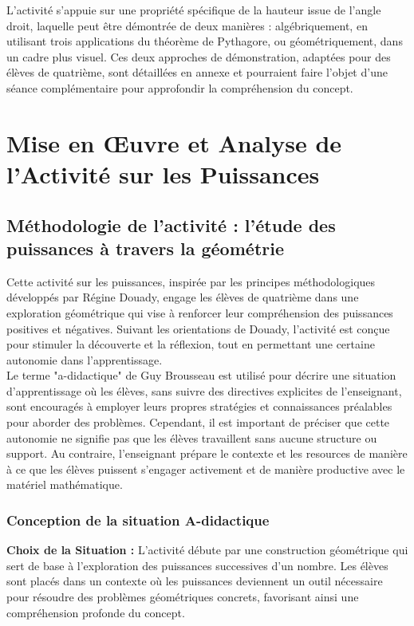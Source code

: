 L'activité s'appuie sur une propriété  spécifique de la hauteur issue de l'angle
droit, laquelle peut être démontrée de deux manières : algébriquement, en
utilisant trois applications du théorème de Pythagore, ou géométriquement, dans
un cadre plus visuel. Ces deux approches de démonstration, adaptées pour des
élèves de quatrième, sont détaillées en annexe et pourraient faire l'objet d'une
séance complémentaire pour approfondir la compréhension du concept.

\section{Mise en Œuvre et Analyse de l'Activité sur les Puissances}

\subsection{Méthodologie de l'activité : l'étude des puissances à travers la géométrie}

Cette activité sur les puissances,
inspirée par les principes méthodologiques développés par Régine Douady,
engage les élèves de quatrième dans une exploration géométrique qui vise à renforcer leur compréhension des puissances positives et négatives.
Suivant les orientations de Douady,
l'activité est conçue pour stimuler la découverte et la réflexion,
tout en permettant une certaine autonomie dans l'apprentissage.\\

Le terme "a-didactique" de Guy Brousseau \cite{brousseau} est utilisé pour décrire une situation d'apprentissage où les élèves,
sans suivre des directives explicites de l'enseignant,
sont encouragés à employer leurs propres stratégies et connaissances préalables pour aborder des problèmes.
Cependant,
il est important de préciser que cette autonomie ne signifie pas que les élèves travaillent sans aucune structure ou support.
Au contraire,
l'enseignant prépare le contexte et les resources de manière à ce que les élèves puissent s'engager activement et de manière productive avec le matériel mathématique.

\subsubsection{Conception de la situation A-didactique}

\textbf{Choix de la Situation :}
L'activité débute par une construction géométrique qui sert de base à l'exploration des puissances successives d'un nombre.
Les élèves sont placés dans un contexte où les puissances deviennent un outil nécessaire pour résoudre des problèmes géométriques concrets,
favorisant ainsi une compréhension profonde du concept.\\

